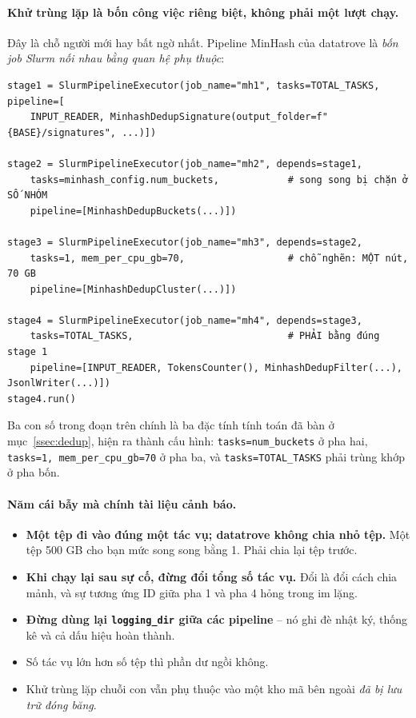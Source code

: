 \paragraph{Khử trùng lặp là bốn công việc riêng biệt, không phải một lượt chạy.} Đây là chỗ người mới hay bất ngờ nhất. Pipeline MinHash của datatrove là \emph{bốn job Slurm nối nhau bằng quan hệ phụ thuộc}:

\begin{verbatim}
stage1 = SlurmPipelineExecutor(job_name="mh1", tasks=TOTAL_TASKS, pipeline=[
    INPUT_READER, MinhashDedupSignature(output_folder=f"{BASE}/signatures", ...)])

stage2 = SlurmPipelineExecutor(job_name="mh2", depends=stage1,
    tasks=minhash_config.num_buckets,            # song song bị chặn ở SỐ NHÓM
    pipeline=[MinhashDedupBuckets(...)])

stage3 = SlurmPipelineExecutor(job_name="mh3", depends=stage2,
    tasks=1, mem_per_cpu_gb=70,                  # chỗ nghẽn: MỘT nút, 70 GB
    pipeline=[MinhashDedupCluster(...)])

stage4 = SlurmPipelineExecutor(job_name="mh4", depends=stage3,
    tasks=TOTAL_TASKS,                           # PHẢI bằng đúng stage 1
    pipeline=[INPUT_READER, TokensCounter(), MinhashDedupFilter(...), JsonlWriter(...)])
stage4.run()
\end{verbatim}

\noindent Ba con số trong đoạn trên chính là ba đặc tính tính toán đã bàn ở mục~\ref{ssec:dedup}, hiện ra thành cấu hình: \texttt{tasks=num\_buckets} ở pha hai, \texttt{tasks=1, mem\_per\_cpu\_gb=70} ở pha ba, và \texttt{tasks=TOTAL\_TASKS} phải trùng khớp ở pha bốn.

\paragraph{Năm cái bẫy mà chính tài liệu cảnh báo.}
\begin{itemize}
	\item \textbf{Một tệp đi vào đúng một tác vụ; datatrove không chia nhỏ tệp.} Một tệp 500 GB cho bạn mức song song bằng 1. Phải chia lại tệp trước.
	\item \textbf{Khi chạy lại sau sự cố, đừng đổi tổng số tác vụ.} Đổi là đổi cách chia mảnh, và sự tương ứng ID giữa pha 1 và pha 4 hỏng trong im lặng.
	\item \textbf{Đừng dùng lại \texttt{logging\_dir} giữa các pipeline} -- nó ghi đè nhật ký, thống kê và cả dấu hiệu hoàn thành.
	\item Số tác vụ lớn hơn số tệp thì phần dư ngồi không.
	\item Khử trùng lặp chuỗi con vẫn phụ thuộc vào một kho mã bên ngoài \emph{đã bị lưu trữ đóng băng}.
\end{itemize}

